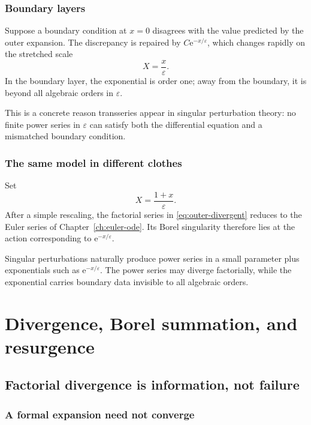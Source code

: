 \documentclass[11pt,oneside]{book}
\theoremstyle{definition}
\theoremstyle{remark}
\newcommand{\e}{\mathrm{e}}
\newcommand{\eps}{\varepsilon}
\begin{document}
\section{Boundary layers}

Suppose a boundary condition at $x=0$ disagrees with the value predicted by the
outer expansion. The discrepancy is repaired by $C\e^{-x/\eps}$, which changes
rapidly on the stretched scale
\[
  X=\frac{x}{\eps}.
\]
In the boundary layer, the exponential is order one; away from the boundary, it
is beyond all algebraic orders in $\eps$.

This is a concrete reason transseries appear in singular perturbation theory:
no finite power series in $\eps$ can satisfy both the differential equation and
a mismatched boundary condition.

\section{The same model in different clothes}

Set
\[
  X=\frac{1+x}{\eps}.
\]
After a simple rescaling, the factorial series in
\eqref{eq:outer-divergent} reduces to the Euler series of
Chapter~\ref{ch:euler-ode}. Its Borel singularity therefore lies at the action
corresponding to $\e^{-x/\eps}$.

\begin{summarybox}
Singular perturbations naturally produce power series in a small parameter plus
exponentials such as $\e^{-x/\eps}$. The power series may diverge factorially,
while the exponential carries boundary data invisible to all algebraic orders.
\end{summarybox}


\part{Divergence, Borel summation, and resurgence}
\label{part:resurgence}

\chapter{Factorial divergence is information, not failure}
\label{ch:factorial-divergence}

\section{A formal expansion need not converge}
\end{document}
